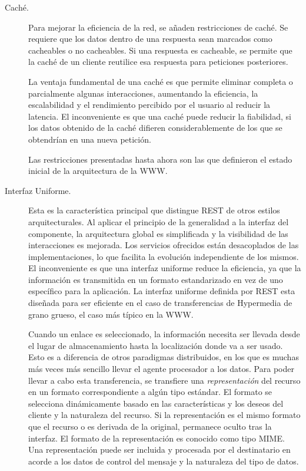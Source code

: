 \begin{description}
\item[Caché.] Para mejorar la eficiencia de la red, se añaden
  restricciones de caché. Se requiere que los datos dentro de una
  respuesta sean marcados como cacheables o no cacheables. Si una
  respuesta es cacheable, se permite que la caché de un cliente
  reutilice esa respuesta para peticiones posteriores.

  La ventaja fundamental de una caché es que permite eliminar completa
  o parcialmente algunas interacciones, aumentando la eficiencia, la
  escalabilidad y el rendimiento percibido por el usuario al reducir
  la latencia. El inconveniente es que una caché puede reducir la
  fiabilidad, si los datos obtenido de la caché difieren
  considerablemente de los que se obtendrían en una nueva petición.

  Las restricciones presentadas hasta ahora son las que definieron el
  estado inicial de la arquitectura de la WWW.

\item[Interfaz Uniforme.] Esta es la característica principal que
  distingue REST de otros estilos arquitecturales. Al aplicar el
  principio de la generalidad a la interfaz del componente, la
  arquitectura global es simplificada y la visibilidad de las
  interacciones es mejorada. Los servicios ofrecidos están
  desacoplados de las implementaciones, lo que facilita la evolución
  independiente de los mismos. El inconveniente es que una interfaz
  uniforme reduce la eficiencia, ya que la información es transmitida
  en un formato estandarizado en vez de uno específico para la
  aplicación. La interfaz uniforme definida por REST esta diseñada
  para ser eficiente en el caso de transferencias de Hypermedia de
  grano grueso, el caso más típico en la WWW.

  Cuando un enlace es seleccionado, la información necesita ser
  llevada desde el lugar de almacenamiento hasta la localización donde
  va a ser usado. Esto es a diferencia de otros paradigmas
  distribuidos, en los que es muchas más veces más sencillo llevar el
  agente procesador a los datos. Para poder llevar a cabo esta
  transferencia, se transfiere una \emph{representación} del recurso
  en un formato correspondiente a algún tipo estándar. El formato se
  selecciona dinámicamente basado en las características y los deseos
  del cliente y la naturaleza del recurso. Si la representación es el
  mismo formato que el recurso o es derivada de la original, permanece
  oculto tras la interfaz. El formato de la representación es
  conocido como tipo MIME\cite{MIME}. Una representación puede ser
  incluida y procesada por el destinatario en acorde a los datos de
  control del mensaje y la naturaleza del tipo de datos.


\end{description}

